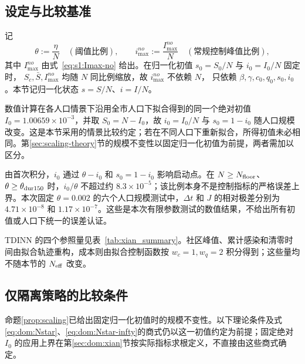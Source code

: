\documentclass[lang=cn,a4paper,newtx]{elegantpaper}
\numberwithin{equation}{section}
\theoremstyle{plain}
\begin{document}
\subsection{设定与比较基准}
\label{sec:dom:setup}

记
\begin{equation}
  \theta:=\frac{\eta}{N}\quad(\text{阈值比例}),\qquad
  i_{\max}^{no}:=\frac{I_{\max}^{no}}{N}\quad(\text{常规控制峰值比例}),
  \label{eq:dom:ratios}
\end{equation}
其中 $I_{\max}^{no}$ 由式~\eqref{eq:s1:Imax-no} 给出。在归一化初值 $s_0=S_0/N$ 与 $i_0=I_0/N$ 固定时，
$S_c,\bar S,I_{\max}^{no}$ 均随 $N$ 同比例缩放，故 $i_{\max}^{no}$ 不依赖 $N$，
只依赖 $\beta,\gamma,c_0,q_0,s_0,i_0$。本节记归一化状态 $s=S/N$、$i=I/N$。

数值计算在各人口情景下沿用全市人口下拟合得到的同一个绝对初值 $I_0=1.00659\times10^{-3}$，并取 $S_0=N-I_0$，故 $i_0=I_0/N$ 与 $s_0=1-i_0$ 随人口规模改变。这是本节采用的情景比较约定；若在不同人口下重新拟合，所得初值未必相同。第\ref{sec:scaling-theory}节的规模不变性以固定归一化初值为前提，两者需加以区分。

由首次积分，$i_0$ 通过 $\theta-i_0$ 和 $s_0=1-i_0$ 影响启动点。在 $N\ge N_{\rm floor}$、$\theta\ge\theta_{\rm dur150}$ 时，$i_0/\theta$ 不超过约 $8.3\times10^{-5}$；该比例本身不是控制指标的严格误差上界。本次固定 $\theta=0.002$ 的六个人口规模测试中，$\Delta t$ 和 $J$ 的相对极差分别为 $4.71\times10^{-8}$ 和 $1.17\times10^{-7}$。这些是本次有限参数测试的数值结果，不给出所有初值或人口下统一的误差认证。

TDINN 的四个参照量见表~\ref{tab:xian_summary}。社区峰值、累计感染和清零时间由拟合轨迹重构，成本则由拟合控制函数按 $w_c=1,w_q=2$ 积分得到；这些量均不随本节的 $N_{\rm eff}$ 改变。


\subsection{仅隔离策略的比较条件}
\label{sec:dom:theory}
命题\ref{prop:scaling}已给出固定归一化初值时的规模不变性。以下理论条件及式\eqref{eq:dom:Nstar}、\eqref{eq:dom:Nstar-infty}的商式仍以这一初值约定为前提；固定绝对 $I_0$ 的应用上界在第\ref{sec:dom:xian}节按实际指标求根定义，不直接由这些商式确定。
\end{document}
